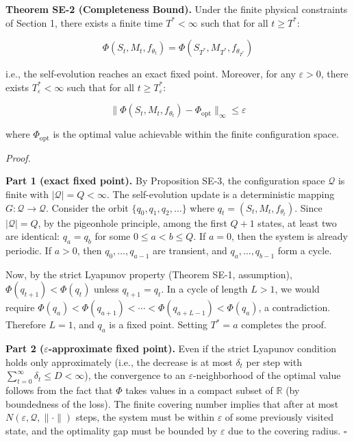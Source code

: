\documentclass[
  12pt,
]{article}
\begin{document}
\textbf{Theorem SE-2 (Completeness Bound).} Under the finite physical
constraints of Section 1, there exists a finite time \(T^* < \infty\)
such that for all \(t \geq T^*\):

\[\Phi(S_t, M_t, f_{\theta_t}) = \Phi(S_{T^*}, M_{T^*}, f_{\theta_{T^*}})\]

i.e., the self-evolution reaches an exact fixed point. Moreover, for any
\(\varepsilon > 0\), there exists \(T_\varepsilon^* < \infty\) such that
for all \(t \geq T_\varepsilon^*\):

\[\|\Phi(S_t, M_t, f_{\theta_t}) - \Phi_{\text{opt}}\|_\infty \leq \varepsilon\]

where \(\Phi_{\text{opt}}\) is the optimal value achievable within the
finite configuration space.

\emph{Proof.}

\textbf{Part 1 (exact fixed point).} By Proposition SE-3, the
configuration space \(\mathcal{Q}\) is finite with
\(|\mathcal{Q}| = Q < \infty\). The self-evolution update is a
deterministic mapping \(G: \mathcal{Q} \to \mathcal{Q}\). Consider the
orbit \(\{q_0, q_1, q_2, \ldots\}\) where
\(q_t = (S_t, M_t, f_{\theta_t})\). Since \(|\mathcal{Q}| = Q\), by the
pigeonhole principle, among the first \(Q+1\) states, at least two are
identical: \(q_a = q_b\) for some \(0 \leq a < b \leq Q\). If \(a = 0\),
then the system is already periodic. If \(a > 0\), then
\(q_0, \ldots, q_{a-1}\) are transient, and \(q_a, \ldots, q_{b-1}\)
form a cycle.

Now, by the strict Lyapunov property (Theorem SE-1, assumption),
\(\Phi(q_{t+1}) < \Phi(q_t)\) unless \(q_{t+1} = q_t\). In a cycle of
length \(L > 1\), we would require
\(\Phi(q_a) < \Phi(q_{a+1}) < \cdots < \Phi(q_{a+L-1}) < \Phi(q_a)\), a
contradiction. Therefore \(L = 1\), and \(q_a\) is a fixed point.
Setting \(T^* = a\) completes the proof.

\textbf{Part 2 (\(\varepsilon\)-approximate fixed point).} Even if the
strict Lyapunov condition holds only approximately (i.e., the decrease
is at most \(\delta_t\) per step with
\(\sum_{t=0}^\infty \delta_t \leq D < \infty\)), the convergence to an
\(\varepsilon\)-neighborhood of the optimal value follows from the fact
that \(\Phi\) takes values in a compact subset of \(\mathbb{R}\) (by
boundedness of the loss). The finite covering number implies that after
at most \(N(\varepsilon, \mathcal{Q}, \|\cdot\|)\) steps, the system
must be within \(\varepsilon\) of some previously visited state, and the
optimality gap must be bounded by \(\varepsilon\) due to the covering
radius. \(\square\)
\end{document}
